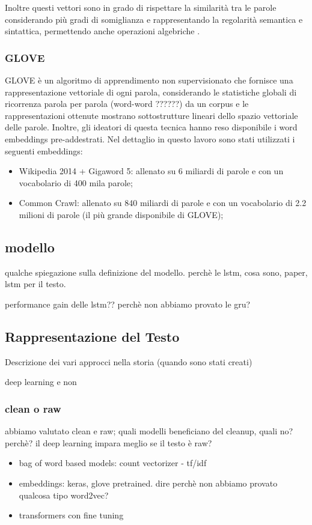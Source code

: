 Inoltre questi vettori sono in grado di rispettare la similarità tra le parole
considerando più gradi di somiglianza e rappresentando la regolarità semantica e
sintattica, permettendo anche operazioni algebriche \cite{mikolov2013efficient}.


\subsubsection{GLOVE}
GLOVE \cite{pennington2014glove} è un algoritmo di apprendimento non supervisionato che fornisce una rappresentazione vettoriale di ogni parola, considerando le statistiche globali di ricorrenza parola per parola (word-word ??????) da un corpus e le rappresentazioni ottenute mostrano sottostrutture lineari dello spazio vettoriale delle parole. Inoltre, gli ideatori di questa tecnica hanno reso disponibile i word embeddings pre-addestrati.
Nel dettaglio in questo lavoro sono stati utilizzati i seguenti embeddings:
\begin{itemize}
	\item Wikipedia 2014 + Gigaword 5: allenato su 6 miliardi di parole e con un vocabolario di 400 mila parole;
	\item Common Crawl: allenato su 840 miliardi di parole e con un vocabolario di 2.2 milioni di parole (il più grande disponibile di GLOVE);
\end{itemize}

\subsection{modello}
qualche spiegazione sulla definizione del modello.
perchè le lstm, cosa sono, paper, lstm per il testo.

performance gain delle lstm??
perchè non abbiamo provato le gru?

\subsection{Rappresentazione del Testo}
Descrizione dei vari approcci nella storia (quando sono stati creati)

deep learning e non

\subsubsection{clean o raw}
abbiamo valutato clean e raw; quali modelli beneficiano del cleanup, quali no?
perchè? il deep learning impara meglio se il testo è raw?

\begin{itemize}
    \item bag of word based models: count vectorizer - tf/idf
    \item embeddings: keras, glove pretrained. dire perchè non abbiamo provato
    qualcosa tipo word2vec?
    \item transformers con fine tuning
\end{itemize}


